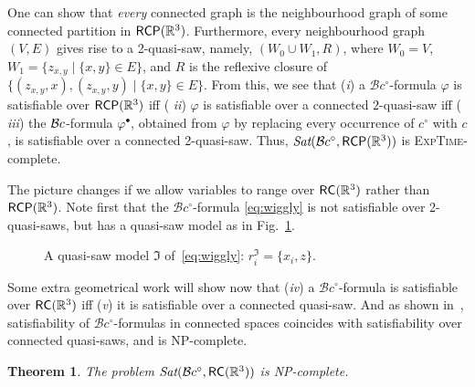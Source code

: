 \documentclass{article}
\newtheorem{theorem}{Theorem}
\newcommand{\ic}{c^\circ}
\newcommand{\NP}{\textsc{NP}}
\newcommand{\ExpTime}{\textsc{ExpTime}}
\newcommand{\Sat}{\textit{Sat}}
\newcommand{\cBci}{\ensuremath{\mathcal{B}c^\circ}}
\newcommand{\R}{\mathbb{R}}
\newcommand{\RC}{{\sf RC}}
\newcommand{\RCP}{{\sf RCP}}
\renewcommand{\phi}{\varphi}
\begin{document}
One can show that {\em every} 
connected graph is the neighbourhood graph of
some connected partition in $\RCP(\R^3)$. Furthermore, every
neighbourhood graph $(V,E)$ gives rise to a 2-quasi-saw, namely, $(W_0
\cup W_1, R)$, where $W_0 = V$, $W_1 = \{z_{x,y} \mid \{x,y\} \in
E\}$, and $R$ is the reflexive closure of $\{(z_{x,y}, x), (z_{x,y},
y) \mid \{x,y\} \in E \}$. From this, we see that ({\em i}) a
$\cBci$-formula $\varphi$ is satisfiable over $\RCP(\R^3)$ iff ({\em
  ii}) $\varphi$ is satisfiable over a connected $2$-quasi-saw iff ({\em
  iii}) the $\mathcal{B}c$-formula $\phi^{\bullet}$, obtained from $\phi$ by
replacing every occurrence of $\ic$ with $c$, is satisfiable over a
connected 2-quasi-saw. Thus, $\Sat(\cBci, \RCP(\R^3))$ is
\ExpTime-complete.

The picture changes if we allow variables to range over $\RC(\R^3)$
rather than $\RCP(\R^3)$. Note first that the $\cBci$-formula
\eqref{eq:wiggly} is not satisfiable over 2-quasi-saws, but has a
quasi-saw model as in Fig.~\ref{fig:broom}.
\begin{figure}[ht]
\centering{}
\vspace*{-3mm}
\caption{A quasi-saw model $\mathfrak{I}$ of~\eqref{eq:wiggly}: $r_i^\mathfrak{I} = \{x_i,z\}$.}
\label{fig:broom}
\end{figure}
Some extra geometrical work will show now that ({\em iv}) a
$\cBci$-formula is satisfiable over $\RC(\R^3)$ iff ({\em v}) it is
satisfiable over a connected quasi-saw.  And as shown
in~\cite{ijcai:kp-hwz10}, satisfiability of $\cBci$-formulas in
connected spaces coincides with satisfiability over connected
quasi-saws, and is \NP-complete.
\begin{theorem}\label{theo:BciRCR3}
The problem $\Sat(\cBci,\RC(\R^3))$ is \NP-complete.
\end{theorem}
\end{document}

